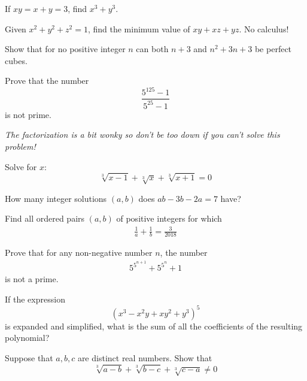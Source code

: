 \documentclass{article}
\begin{document}
\begin{exercise}
If $xy=x+y = 3$, find $x^3+y^3$.
\end{exercise}

\begin{exercise}
            Given $x^2 + y^2 + z^2 = 1$, find the minimum value of $xy+xz+yz$. No calculus!
\end{exercise}

\begin{exercise}
    Show that for no positive integer $n$ can both $n+3$ and $n^2 +3n+3$ be perfect cubes.
\end{exercise}

\begin{exercise}
Prove that the number
\[\frac{5^{125}-1}{5^{25}-1}\]
is not prime.

\emph{The factorization is a bit wonky so don't be too down if you can't solve this problem!}
\end{exercise}

\begin{exercise}
            Solve for $x$:
            \[\sqrt[3]{x-1} + \sqrt[3]{x}  + \sqrt[3]{x+1} = 0\]
\end{exercise}
            
\begin{exercise}
            How many integer solutions \((a,b)\) does \(ab-3b-2a=7\) have?
\end{exercise}
            
\begin{exercise}
Find all ordered pairs \((a,b)\) of positive integers for
which
\begin{align*} 
    \frac{1}{a} + \frac{1}{b} = \frac{3}{2018}
\end{align*}
\end{exercise}

\begin{exercise}
Prove that for any non-negative number $n$, the number 
\begin{align*}
    5^{5^{n+1}} + 5^{5^n} + 1
\end{align*}
is not a prime.
\end{exercise}

\begin{exercise}
            If the expression 
            \[(x^3-x^2y+xy^2+y^3)^5\] 
            is expanded and simplified, what is the sum of all the coefficients of the resulting polynomial?
\end{exercise}

        
\begin{exercise}
        Suppose that $a,b,c$ are distinct real numbers. Show that 
            \begin{equation*}
                \sqrt[3]{a - b} + \sqrt[3]{b - c}  + \sqrt[3]{c - a} \neq 0
            \end{equation*}
\end{exercise}
\end{document}

